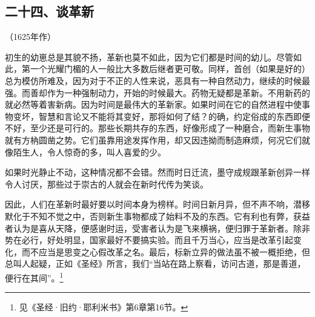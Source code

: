 \subsection*{二十四、谈革新}
\begin{center}
    （1625年作）
\end{center}
\par 初生的幼崽总是其貌不扬，革新也莫不如此，因为它们都是时间的幼儿。尽管如此，第一个光耀门楣的人一般比大多数后继者更可敬。同样，首创（如果是好的）总为模仿所难及，因为对于不正的人性来说，恶具有一种自然动力，继续的时候最强。而善却作为一种强制动力，开始的时候最大。药物无疑都是革新。不用新药的就必然等着害新病。因为时间是最伟大的革新家。如果时间在它的自然进程中使事物变坏，智慧和言论又不能将其变好，那将如何了结？的确，约定俗成的东西即便不好，至少还是可行的。那些长期共存的东西，好像形成了一种磨合，而新生事物就有方枘圆凿之势。它们虽靠用途发挥作用，却又因违拗而制造麻烦，何况它们就像陌生人，令人惊奇的多，叫人喜爱的少。
\par 如果时光静止不动，这种情况都不会错。然而时日迁流，墨守成规跟革新创异一样令人讨厌，那些过于崇古的人就会在新时代传为笑谈。
\par 因此，人们在革新时最好要以时间本身为榜样。时间日新月异，但不声不响，潜移默化于不知不觉之中，否则新生事物都成了始料不及的东西。它有利也有弊，获益者认为是喜从天降，便感谢时运，受害者认为是飞来横祸，便归罪于革新者。除非势在必行，好处明显，国家最好不要搞实验。而且千万当心，应当是改革引起变化，而不应当是思变之心假改革之名。最后，标新立异的做法虽不被一概拒绝，但总叫人起疑，正如《圣经》所言，我们“当站在路上察看，访问古道，那是善道，便行在其间”。\footnote{见《圣经·旧约·耶利米书》第6章第16节。}




